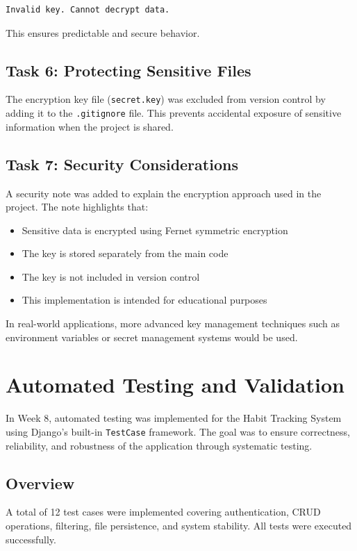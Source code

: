 \documentclass[12pt]{article}
\begin{document}
\begin{verbatim}
Invalid key. Cannot decrypt data.
\end{verbatim}

This ensures predictable and secure behavior.

\subsection{Task 6: Protecting Sensitive Files}

The encryption key file (\texttt{secret.key}) was excluded from version control by adding it to the \texttt{.gitignore} file. This prevents accidental exposure of sensitive information when the project is shared.

\subsection{Task 7: Security Considerations}

A security note was added to explain the encryption approach used in the project. The note highlights that:

\begin{itemize}
\item Sensitive data is encrypted using Fernet symmetric encryption
\item The key is stored separately from the main code
\item The key is not included in version control
\item This implementation is intended for educational purposes
\end{itemize}

In real-world applications, more advanced key management techniques such as environment variables or secret management systems would be used.

\section{Automated Testing and Validation}

In Week 8, automated testing was implemented for the Habit Tracking System using Django's built-in \texttt{TestCase} framework. The goal was to ensure correctness, reliability, and robustness of the application through systematic testing.

\subsection{Overview}
A total of 12 test cases were implemented covering authentication, CRUD operations, filtering, file persistence, and system stability. All tests were executed successfully.
\end{document}

